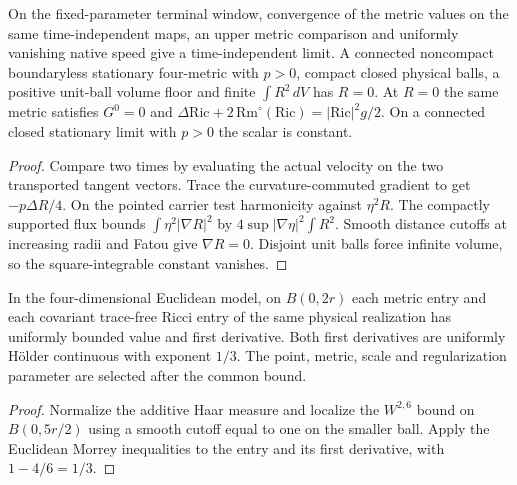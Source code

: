 \begin{proposition}
\label{prop:ed51-scalar}
\leanok
On the fixed-parameter terminal window, convergence of the metric values
on the same time-independent maps, an upper metric comparison and uniformly
vanishing native speed give a time-independent limit. A connected noncompact
boundaryless stationary four-metric with $p>0$, compact closed physical balls,
a positive unit-ball volume floor and finite $\int R^2\,dV$ has $R=0$.
At $R=0$ the same metric satisfies $G^0=0$ and
$\Delta\mathrm{Ric}+2\,\mathrm{Rm}^{\circ}(\mathrm{Ric})
=|\mathrm{Ric}|^2g/2$. On a connected closed stationary limit with
$p>0$ the scalar is constant.
\end{proposition}
\begin{proof}
\leanok
Compare two times by evaluating the actual velocity on the two transported
tangent vectors. Trace the curvature-commuted gradient to get
$-p\Delta R/4$. On the pointed carrier test harmonicity against $\eta^2 R$.
The compactly supported flux bounds $\int\eta^2|\nabla R|^2$ by
$4\sup|\nabla\eta|^2\int R^2$. Smooth distance cutoffs at increasing
radii and Fatou give $\nabla R=0$. Disjoint unit balls force infinite
volume, so the square-integrable constant vanishes.
\end{proof}


\begin{proposition}
\label{prop:ed51-morrey}
\leanok
In the four-dimensional Euclidean model, on $B(0,2r)$ each metric entry
and each covariant trace-free Ricci entry of the same physical realization
has uniformly bounded value and first derivative. Both first derivatives
are uniformly H\"older continuous with exponent $1/3$. The point, metric,
scale and regularization parameter are selected after the common bound.
\end{proposition}
\begin{proof}
\leanok
Normalize the additive Haar measure and localize the $W^{2,6}$ bound on
$B(0,5r/2)$ using a smooth cutoff equal to one on the smaller ball.
Apply the Euclidean Morrey inequalities to the entry and its first
derivative, with $1-4/6=1/3$.
\end{proof}
